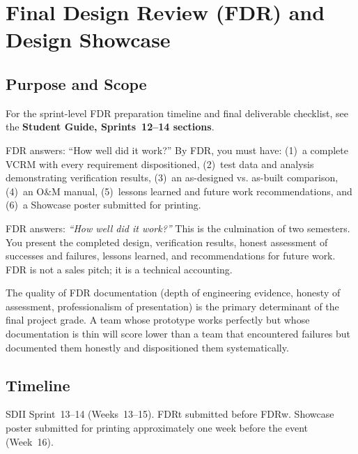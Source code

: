 \chapter{Final Design Review (FDR) and Design Showcase}

\section{Purpose and Scope}

\begin{tipbox}
For the sprint-level FDR preparation timeline and final deliverable checklist, see the \textbf{Student Guide, Sprints~12--14 sections}.
\end{tipbox}


\begin{keyconceptbox}
FDR answers: ``How well did it work?'' By FDR, you must have: (1)~a complete VCRM with every requirement dispositioned, (2)~test data and analysis demonstrating verification results, (3)~an as-designed vs. as-built comparison, (4)~an O\&M manual, (5)~lessons learned and future work recommendations, and (6)~a Showcase poster submitted for printing.
\end{keyconceptbox}

FDR answers: \emph{``How well did it work?''} This is the culmination of two semesters. You present the completed design, verification results, honest assessment of successes and failures, lessons learned, and recommendations for future work. FDR is not a sales pitch; it is a technical accounting.

The quality of FDR documentation (depth of engineering evidence, honesty of assessment, professionalism of presentation) is the primary determinant of the final project grade. A team whose prototype works perfectly but whose documentation is thin will score lower than a team that encountered failures but documented them honestly and dispositioned them systematically.

\section{Timeline}
SDII Sprint~13--14 (Weeks~13--15). FDRt submitted before FDRw. Showcase poster submitted for printing approximately one week before the event (Week~16).


